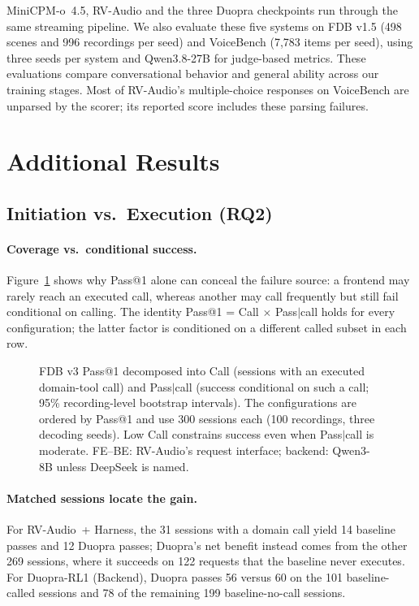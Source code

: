 MiniCPM-o~4.5, RV-Audio and the three Duopra checkpoints run through the same streaming pipeline.
We also evaluate these five systems on FDB v1.5 \citep{lin2025fdbv15} (498 scenes and 996 recordings per seed) and VoiceBench \citep{chen2024voicebench} (7,783 items per seed), using three seeds per system and Qwen3.8-27B for judge-based metrics.
These evaluations compare conversational behavior and general ability across our training stages.
Most of RV-Audio's multiple-choice responses on VoiceBench are unparsed by the scorer; its reported score includes these parsing failures.

\section{Additional Results}
\label{app:results}

\subsection{Initiation vs.\ Execution (RQ2)}

\paragraph{Coverage vs.\ conditional success.}
Figure~\ref{fig:decomp} shows why Pass@1 alone can conceal the failure source: a frontend may rarely reach an executed call, whereas another may call frequently but still fail conditional on calling. The identity Pass@1 = Call $\times$ Pass$|$call holds for every configuration; the latter factor is conditioned on a different called subset in each row.

\begin{figure}[t]
\centering
{}
\caption{FDB v3 Pass@1 decomposed into Call (sessions with an executed domain-tool call) and Pass$|$call (success conditional on such a call; 95\% recording-level bootstrap intervals). The configurations are ordered by Pass@1 and use 300 sessions each (100 recordings, three decoding seeds). Low Call constrains success even when Pass$|$call is moderate. FE--BE: RV-Audio's request interface; backend: Qwen3-8B unless DeepSeek is named.}
\label{fig:decomp}
\end{figure}

\paragraph{Matched sessions locate the gain.}
For RV-Audio~+ Harness, the 31 sessions with a domain call yield 14 baseline passes and 12 Duopra passes; Duopra's net benefit instead comes from the other 269 sessions, where it succeeds on 122 requests that the baseline never executes. For Duopra-RL1 (Backend), Duopra passes 56 versus 60 on the 101 baseline-called sessions and 78 of the remaining 199 baseline-no-call sessions.

